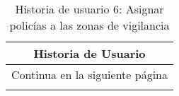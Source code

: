 


\begin{longtable}{|p{6.7cm}|p{6.7cm}|}
    \caption{Historia de usuario 6: Asignar policías a las zonas de vigilancia} \label{tab:historia-6}
    \\
    \hline
    \multicolumn{2}{|c|}{\textbf{Historia de Usuario}}                                                                                                           \\
    \hline

    \endfirsthead

    \hline
    \endhead

    \hline
    \multicolumn{2}{|c|}{{Continua en la siguiente página}}                                                                                                      \\
    \hline
    \endfoot

    \hline
    \endlastfoot


\end{longtable}
